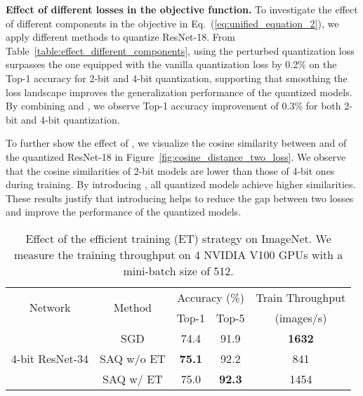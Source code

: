 

\noindent\textbf{Effect of different losses in the objective function.} To investigate the effect of different components in the objective in Eq.~(\ref{eq:unified_equation_2}), we apply different methods to quantize ResNet-18. 
From Table~\ref{table:effect_different_components}, using the perturbed quantization loss  surpasses the one equipped with the vanilla quantization loss  by 0.2\% on the Top-1 accuracy for 2-bit and 4-bit quantization, supporting that smoothing the loss landscape improves the generalization performance of the quantized models. By combining  and , we observe Top-1 accuracy improvement of 0.3\% for both 2-bit and 4-bit quantization. 

To further show the effect of , we visualize the cosine similarity between  and  of the quantized ResNet-18 in Figure~\ref{fig:cosine_distance_two_loss}. We observe that the cosine similarities of 2-bit models are lower than those of 4-bit ones during training. By introducing , all quantized models achieve higher similarities. These results justify that introducing  helps to reduce the gap between two losses and improve the performance of the quantized models.

\begin{table}[t]
\renewcommand{\arraystretch}{1.3}
\caption{Effect of the efficient training (ET) strategy on ImageNet. We measure the training throughput on 4 NVIDIA V100 GPUs with a mini-batch size of 512.
}
\vspace{-0.1in}
\centering
\scalebox{0.72}
{
\begin{tabular}{ccccc}
\toprule
\multirow{2}{*}{Network} & \multirow{2}{*}{Method} & \multicolumn{2}{c}{Accuracy (\%)} & Train Throughput \\
& & Top-1 & Top-5 & (images/s) \\
\midrule
\multirow{3}{*}{4-bit ResNet-34} & SGD & 74.4 & 91.9 & \textbf{1632} \\
& SAQ w/o ET & \textbf{75.1} & 92.2 & 841 \\
& SAQ w/ ET & 75.0 & \textbf{92.3} & 1454 \\
\bottomrule
\end{tabular}
}
\label{table:effect_efficient_SAQ}
\vspace{-0.12in}
\end{table}



